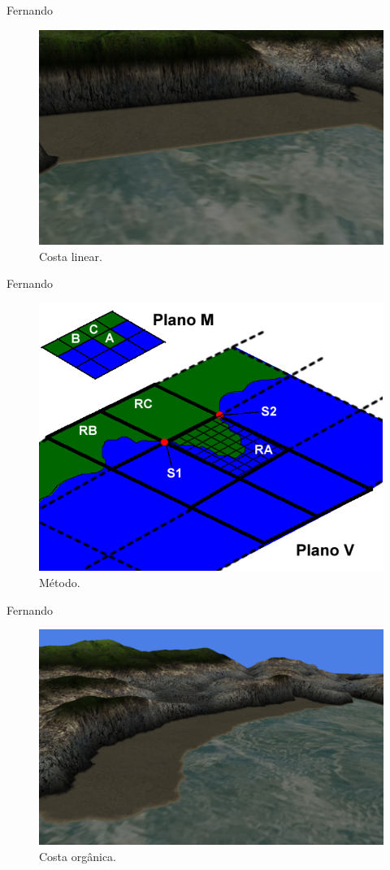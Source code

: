 \begin{frame}{Fernando}
  \begin{figure}
		\centering
        \includegraphics[width=.8\textwidth]
        {img/uffs/fernando/linearcosta.png}
        \caption{Costa linear.}
  \end{figure}
\end{frame}

\begin{frame}{Fernando}
  \begin{figure}
		\centering
        \includegraphics[width=.8\textwidth]{img/uffs/fernando/metodo.png}
        \caption{Método.}
  \end{figure}
\end{frame}

\begin{frame}{Fernando}
  \begin{figure}
		\centering
        \includegraphics[width=.8\textwidth]
        {img/uffs/fernando/costaorganica.png}
        \caption{Costa orgânica.}
  \end{figure}
\end{frame}